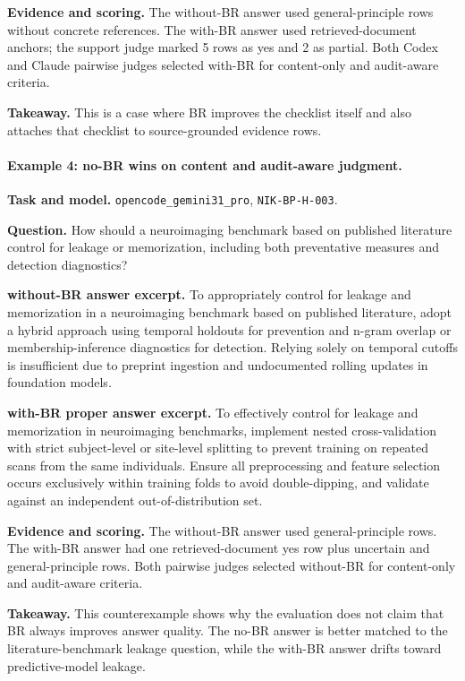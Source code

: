 {\textbf{Evidence and scoring.} The without-BR answer used general-principle rows without concrete references. The with-BR answer used retrieved-document anchors; the support judge marked 5 rows as yes and 2 as partial. Both Codex and Claude pairwise judges selected with-BR for content-only and audit-aware criteria.

\textbf{Takeaway.} This is a case where BR improves the checklist itself and also attaches that checklist to source-grounded evidence rows.

\medskip

\paragraph{Example 4: no-BR wins on content and audit-aware judgment.}
\textbf{Task and model.} \texttt{opencode\_gemini31\_pro}, \texttt{NIK-BP-H-003}.

\textbf{Question.} How should a neuroimaging benchmark based on published literature control for leakage or memorization, including both preventative measures and detection diagnostics?

\textbf{without-BR answer excerpt.} To appropriately control for leakage and memorization in a neuroimaging benchmark based on published literature, adopt a hybrid approach using temporal holdouts for prevention and n-gram overlap or membership-inference diagnostics for detection. Relying solely on temporal cutoffs is insufficient due to preprint ingestion and undocumented rolling updates in foundation models.

\textbf{with-BR proper answer excerpt.} To effectively control for leakage and memorization in neuroimaging benchmarks, implement nested cross-validation with strict subject-level or site-level splitting to prevent training on repeated scans from the same individuals. Ensure all preprocessing and feature selection occurs exclusively within training folds to avoid double-dipping, and validate against an independent out-of-distribution set.

\textbf{Evidence and scoring.} The without-BR answer used general-principle rows. The with-BR answer had one retrieved-document yes row plus uncertain and general-principle rows. Both pairwise judges selected without-BR for content-only and audit-aware criteria.

\textbf{Takeaway.} This counterexample shows why the evaluation does not claim that BR always improves answer quality. The no-BR answer is better matched to the literature-benchmark leakage question, while the with-BR answer drifts toward predictive-model leakage.

}
